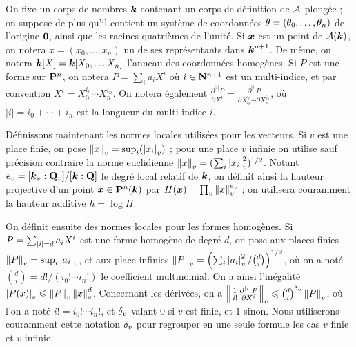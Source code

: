 On fixe un corps de nombres $\boldsymbol{k}$ contenant un corps de définition de $\mathcal{A}$
plongée ; on suppose de plus qu'il contient un système de coordonnées $\theta =
(\theta_0,\dots,\theta_n)$ de l'origine ${\boldsymbol{0}}$, ainsi que les racines quatrièmes de
l'unité. Si ${\boldsymbol{x}}$ est un point de $\mathcal{A}(\boldsymbol{k})$, on notera $x = (x_0, \dots,
x_n)$ un de ses représentants dans $\boldsymbol{k}^{n+1}$. De même, on notera $\boldsymbol{k}[X] =
\boldsymbol{k}[X_0, \dots X_n]$ l'anneau des coordonnées homogènes. Si $P$ est une forme
sur $\mathbf{P}^n$, on notera $P= \sum_i a_i X^i$ où $i \in \mathbf{N}^{n+1}$ est un
multi-indice, et par convention $X^i = X_0^{i_0}\cdots X_n^{i_n}$. On notera
également $\frac{\partial^{|i|} P}{\partial X^i} = \frac{\partial^{|i|}
  P}{\partial X_0^{i_0}\cdots \partial X_n^{i_n}}$, où $|i| = i_0 + \cdots +
i_n$ est la longueur du multi-indice $i$.

Définissons maintenant les normes locales utilisées pour les vecteurs. Si $v$
est une place finie, on pose $\left\lVert x\right\rVert_{v} = \sup_i(\left\lvert x_i\right\rvert_{v})$ ; pour une place $v$
infinie on utilise sauf précision contraire la norme euclidienne $\left\lVert x\right\rVert_{v} = (
\sum_i \left\lvert x_i\right\rvert_{v}^2 )^{1/2}$. Notant $e_v = [\boldsymbol{k}_v : \mathbf{Q}_v]/[\boldsymbol{k} : \mathbf{Q}]$ le degré
local relatif de $\boldsymbol{k}$, on définit ainsi la hauteur projective d'un point
${\boldsymbol{x}} \in \mathbf{P}^n(\boldsymbol{k})$ par $H({\boldsymbol{x}}) = \prod_v \left\lVert x\right\rVert_{v}^{e_v}$ ; on utilisera
couramment la hauteur additive $h = \log H$.

On définit ensuite des normes locales pour les formes homogènes. Si $P =
\sum_{{|i|} =d} a_i X^i$ est une forme homogène de degré $d$, on pose aux
places finies $\left\lVert P\right\rVert_{v} = \sup_i \left\lvert a_i\right\rvert_{v}$, et aux place infinies $\left\lVert P\right\rVert_{v} =
\left( \sum_i \left\lvert a_i\right\rvert_{v}^2/\binom{d}{i} \right)^{1/2}$, où on a noté
$\binom{d}{i} = d!/(i_0!\cdots i_n!)$ le coefficient multinomial. On a ainsi
l'inégalité $\left\lvert P(x)\right\rvert_{v} \leqslant \left\lVert P\right\rVert_{v} \left\lVert x\right\rVert_{v}^d$. Concernant les dérivées, on a
$\left\lVert\frac{1}{i!}\frac{\partial^{|i|}P}{\partial X^i}\right\rVert_{v} \leqslant \binom{d}{i}^{\delta_v}
\left\lVert P\right\rVert_{v}$, où l'on a noté $i! = i_0! \cdots i_n!$, et ${\delta_v}$ valant $0$ si $v$
est finie, et $1$ sinon. Nous utiliserons couramment cette notation ${\delta_v}$ pour
regrouper en une seule formule les cas $v$ finie et $v$ infinie.

